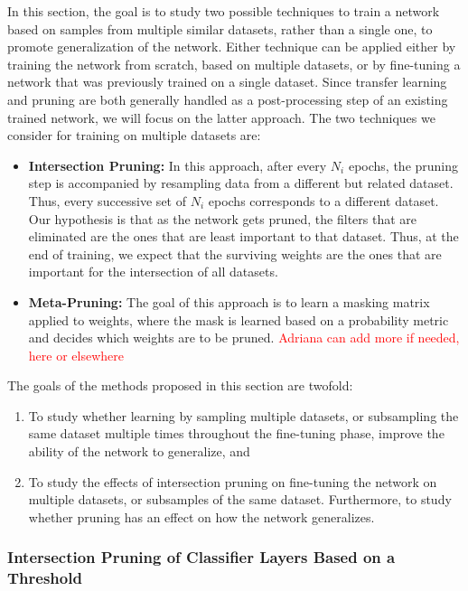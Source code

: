 \documentclass{article}
\begin{document}
In this section, the goal is to study two possible techniques to train a network based on samples from multiple similar datasets, rather than a single one, to promote generalization of the network. Either technique can be applied either by training the network from scratch, based on multiple datasets, or by fine-tuning a network that was previously trained on a single dataset. Since transfer learning and pruning are both generally handled as a post-processing step of an existing trained network, we will focus on the latter approach. The two techniques we consider for training on multiple datasets are:
\begin{itemize}
	\item \textbf{Intersection Pruning:} In this approach, after every $N_i$ epochs, the pruning step is accompanied by resampling data from a different but related dataset. Thus, every successive set of $N_i$ epochs corresponds to a different dataset. Our hypothesis is that as the network gets pruned, the filters that are eliminated are the ones that are least important to that dataset. Thus, at the end of training, we expect that the surviving weights are the ones that are important for the intersection of all datasets.
	\item \textbf{Meta-Pruning:} The goal of this approach is to learn a masking matrix applied to weights, where the mask is learned based on a probability metric and decides which weights are to be pruned. \textcolor{red}{Adriana can add more if needed, here or elsewhere} 
\end{itemize}
The goals of the methods proposed in this section are twofold:
\begin{enumerate}
	\item To study whether learning by sampling multiple datasets, or subsampling the same dataset multiple times throughout the fine-tuning phase, improve the ability of the network to generalize, and
	\item To study the effects of intersection pruning on fine-tuning the network on multiple datasets, or subsamples of the same dataset. Furthermore, to study whether pruning has an effect on how the network generalizes.
\end{enumerate}

\subsubsection{Intersection Pruning of Classifier Layers Based on a Threshold} \label{intersectPruneClass}
\end{document}
